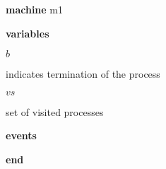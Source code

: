 \begin{block}
  \item   \textbf{machine} m1
  \item   \textbf{variables}
  \begin{block}
    \item   $b$
    \item   \begin{block}
      \item    indicates termination of the process 
    \end{block}
    \item   $vs$
    \item   \begin{block}
      \item   set of visited processes
    \end{block}
  \end{block}
  \item   
  \item   
  \item   
  \item   \textbf{events}
  \begin{block}
    \item   
    \item   
  \end{block}
  \item   \textbf{end} \\
\end{block}
